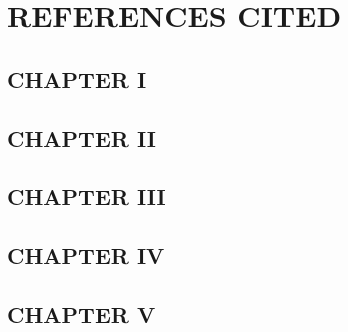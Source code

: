 \chapter{REFERENCES CITED}

\section{CHAPTER I}

\section{CHAPTER II}

\section{CHAPTER III}

\section{CHAPTER IV}

\section{CHAPTER V}
